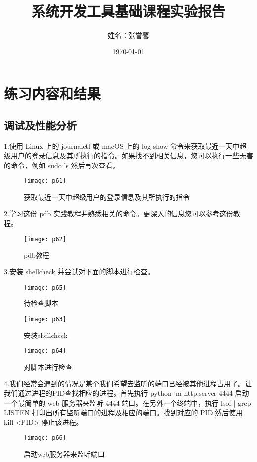 \documentclass[a4paper ,12pt]{article}
\begin{document}
	
	\title{系统开发工具基础课程实验报告}
	\author{姓名：张誉馨}
	\date{\today}
	\maketitle
	
	\tableofcontents
	\newpage
	
	\section{练习内容和结果}
	
	\subsection{调试及性能分析}
	1.使用 Linux 上的 journalctl 或 macOS 上的 log show 命令来获取最近一天中超级用户的登录信息及其所执行的指令。如果找不到相关信息，您可以执行一些无害的命令，例如 sudo ls 然后再次查看。
	\begin{figure}[h]
		\centering
		\texttt{[image: p61]}
		\caption{获取最近一天中超级用户的登录信息及其所执行的指令}
	\end{figure}
	
	2.学习这份 pdb 实践教程并熟悉相关的命令。更深入的信息您可以参考这份教程。
	\begin{figure}[h]
		\centering
		\texttt{[image: p62]}
		\caption{pdb教程}
	\end{figure}
	
	3.安装 shellcheck 并尝试对下面的脚本进行检查。
	\begin{figure}[h]
		\centering
		\texttt{[image: p65]}
		\caption{待检查脚本}
	\end{figure}
	
	\begin{figure}[h]
		\centering
		\texttt{[image: p63]}
		\caption{安装shellcheck}
	\end{figure}
	
	\begin{figure}[h]
		\centering
		\texttt{[image: p64]}
		\caption{对脚本进行检查}
	\end{figure}
	
	4.我们经常会遇到的情况是某个我们希望去监听的端口已经被其他进程占用了。让我们通过进程的PID查找相应的进程。首先执行 python -m http.server 4444 启动一个最简单的 web 服务器来监听 4444 端口。在另外一个终端中，执行 lsof | grep LISTEN 打印出所有监听端口的进程及相应的端口。找到对应的 PID 然后使用 kill <PID> 停止该进程。
	\begin{figure}[h]
		\centering
		\texttt{[image: p66]}
		\caption{启动web服务器来监听端口}
	\end{figure}
	
\end{document}
